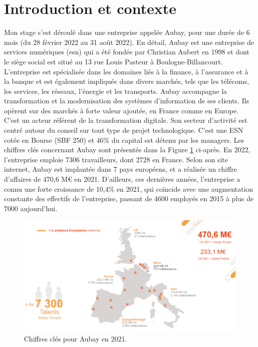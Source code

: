 \documentclass[11pt]{article}
\begin{document}
  \section{Introduction et contexte}      
    Mon stage s'est déroulé dans une entreprise appelée Aubay, pour une durée de 6 mois (du 28 février 2022 au 31 août 2022). 
    En détail, Aubay est une entreprise de services numériques (\acrshort{esn}) qui a été fondée par Christian Aubert en 1998 et 
    dont le siège social est situé au 13 rue Louis Pasteur à Boulogne-Billancourt. L'entreprise est spécialisée dans les domaines 
    liés à la finance, à l'assurance et à la banque et est également impliquée dans divers marchés, tels que les télécoms, 
    les services, les réseaux, l'énergie et les transports. Aubay accompagne la transformation et la modernisation des systèmes 
    d’information de ses clients. Ils opèrent sur des marchés à forte valeur ajoutée, en France comme en Europe. C'est un acteur 
    référent de la transformation digitale. Son secteur d'activité est centré autour du conseil sur tout type de projet technologique.  
    C'est une ESN cotée en Bourse (SBF 250) et 46\% du capital est détenu par les managers. Les chiffres clés concernant Aubay 
    sont présentés dans la Figure \ref{fig:PA1} ci-après. En 2022, l'entreprise emploie 7306 travailleurs, dont 2728 en France. 
    Selon son site internet, Aubay est implantée dans 7 pays européens, et a réalisée un chiffre d'affaires de 470,6 M€ en 2021. 
    D'ailleurs, ces dernières années, l'entreprise a connu une forte croissance de 10,4\% en 2021, qui coïncide avec une augmentation 
    constante des effectifs de l'entreprise, passant de 4600 employés en 2015 à plus de 7000 aujourd'hui.
  
    \begin{figure}[hbt]  
      \includegraphics[width=\textwidth]{PresentationAubay1.png}    
      \caption{Chiffres clés pour Aubay en 2021.}
      \label{fig:PA1}
    \end{figure}    
    
\end{document}
